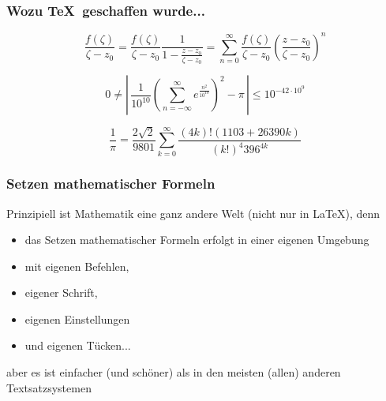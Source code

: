 \begin{frame}
  \frametitle{Wozu \TeX\ geschaffen wurde...}

  \onslide<+->

  \begin{equation*}
    \frac{f\left(\zeta\right)}{\zeta-z_0} = \frac{f\left(\zeta\right)}
    {\zeta-z_0}\frac{1}{
      1-\frac{z-z_0}{\zeta-z_0}} = \sum_{n=0}^{\infty}\frac{f\left(\zeta\right)}
    {\zeta-z_0}
    \left(\frac{z-z_0}{\zeta-z_0}\right)^n
  \end{equation*}

  \medskip

  \begin{equation*}
    0 \neq \left|\, \frac{1}{10^{10}} \left( \sum_{n = -\infty}^{\infty}
        e^{\frac{n^2}{10^{10}}} \right)^2 - \pi \,\right|
    \le 10^{-42 \cdot 10^9}
  \end{equation*}

  \medskip

  \begin{equation*}
    \frac{1}{\pi} = \frac{2\sqrt{2}}{9801} \sum^\infty_{k=0} \frac{(4k)!(1103+26390k)}{(k!)^4 396^{4k}}
  \end{equation*}

\end{frame}

\begin{frame}
  \frametitle{Setzen mathematischer Formeln}

  \onslide<+->

  Prinzipiell ist Mathematik eine ganz andere Welt (nicht nur in \LaTeX), denn
  \begin{itemize}
  \item<+-> das Setzen mathematischer Formeln erfolgt in einer eigenen Umgebung
  \item<+-> mit eigenen Befehlen,
  \item<+-> eigener Schrift,
  \item<+-> eigenen Einstellungen
  \item<+-> und eigenen Tücken...
  \end{itemize}

  \onslide<+->

  aber es ist einfacher (und schöner) als in den meisten (allen) anderen Textsatzsystemen
\end{frame}

